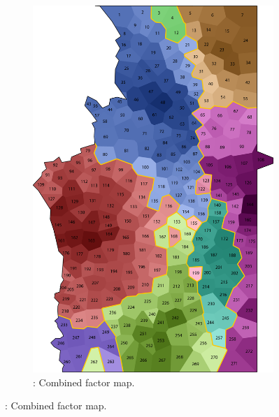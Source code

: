 \documentclass[output=paper]{LSP/langsci}
\begin{document}
\begin{figure}
\begin{subfigure}[t]{0.3\textwidth}
\includegraphics[width=\textwidth]{illustrations/pickl_fig11}
\caption{: Combined factor map.}
\label{fig:11}
\end{subfigure}
\end{figure}
\end{document}
